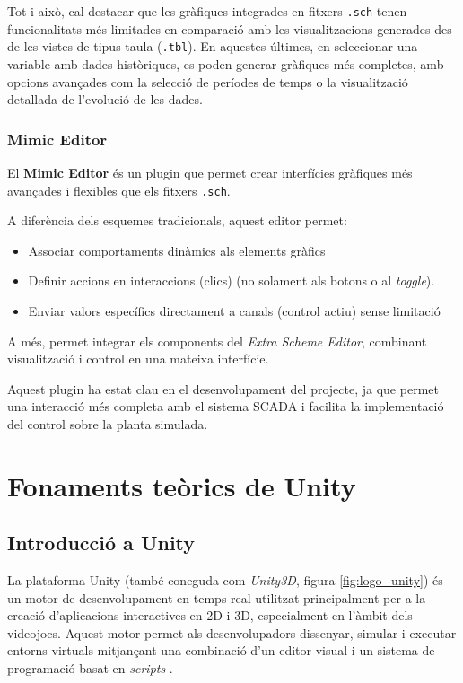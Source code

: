 \documentclass[a4paper,11pt,DIV=13,headings=normal,abstract=true,twoside=semi]{article}
\begin{document}
Tot i això, cal destacar que les gràfiques integrades en fitxers \texttt{.sch} tenen funcionalitats més limitades en comparació amb les visualitzacions generades des de les vistes de tipus taula (\texttt{.tbl}). En aquestes últimes, en seleccionar una variable amb dades històriques, es poden generar gràfiques més completes, amb opcions avançades com la selecció de períodes de temps o la visualització detallada de l'evolució de les dades.

\subsubsection*{Mimic Editor}

El \textbf{Mimic Editor} és un plugin que permet crear interfícies gràfiques més avançades i flexibles que els fitxers \texttt{.sch}.

A diferència dels esquemes tradicionals, aquest editor permet:
\begin{itemize}
    \item Associar comportaments dinàmics als elements gràfics 
    \item Definir accions en interaccions (clics) (no solament als botons o al \textit{toggle}).
    \item Enviar valors específics directament a canals (control actiu) sense limitació
\end{itemize}

A més, permet integrar els components del \textit{Extra Scheme Editor}, combinant visualització i control en una mateixa interfície.

Aquest plugin ha estat clau en el desenvolupament del projecte, ja que permet una interacció més completa amb el sistema SCADA i facilita la implementació del control sobre la planta simulada.

\newpage
\section{Fonaments teòrics de Unity}
\label{sec:unity_theory}
\subsection{Introducció a Unity}


La plataforma Unity (també coneguda com \textit{Unity3D}, figura \ref{fig:logo_unity}) és un motor de desenvolupament en temps real utilitzat principalment per a la creació d'aplicacions interactives en 2D i 3D, especialment en l'àmbit dels videojocs. Aquest motor permet als desenvolupadors dissenyar, simular i executar entorns virtuals mitjançant una combinació d'un editor visual i un sistema de programació basat en \textit{scripts} \cite{Unity}.
\end{document}

